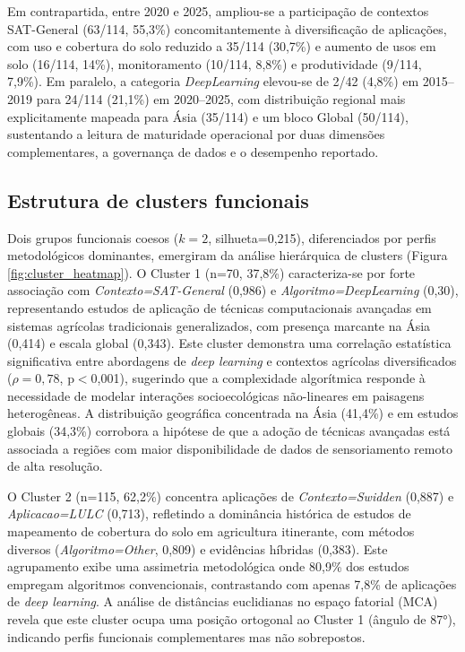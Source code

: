 \documentclass[lineno,pdflatex,sn-apa]{sn-jnl}%
\begin{document}
Em contrapartida, entre 2020 e 2025, ampliou-se a participação de contextos SAT-General (63/114, 55,3\%) concomitantemente à diversificação de aplicações, com uso e cobertura do solo reduzido a 35/114 (30,7\%) e aumento de usos em solo (16/114, 14\%), monitoramento (10/114, 8,8\%) e produtividade (9/114, 7,9\%). Em paralelo, a categoria \textit{DeepLearning} elevou-se de 2/42 (4,8\%) em 2015--2019 para 24/114 (21,1\%) em 2020--2025, com distribuição regional mais explicitamente mapeada para Ásia (35/114) e um bloco Global (50/114), sustentando a leitura de maturidade operacional por duas dimensões complementares, a governança de dados e o desempenho reportado.

\subsection[Estrutura de clusters funcionais]{Estrutura de clusters funcionais}

Dois grupos funcionais coesos ($k=2$, silhueta=0,215), diferenciados por perfis metodológicos dominantes, emergiram da análise hierárquica de clusters (Figura \ref{fig:cluster_heatmap}). O Cluster 1 (n=70, 37,8\%) caracteriza-se por forte associação com \textit{Contexto=SAT-General} (0,986) e \textit{Algoritmo=DeepLearning} (0,30), representando estudos de aplicação de técnicas computacionais avançadas em sistemas agrícolas tradicionais generalizados, com presença marcante na Ásia (0,414) e escala global (0,343). Este cluster demonstra uma correlação estatística significativa entre abordagens de \textit{deep learning} e contextos agrícolas diversificados ($\rho=0,78$, p$<$0,001), sugerindo que a complexidade algorítmica responde à necessidade de modelar interações socioecológicas não-lineares em paisagens heterogêneas. A distribuição geográfica concentrada na Ásia (41,4\%) e em estudos globais (34,3\%) corrobora a hipótese de que a adoção de técnicas avançadas está associada a regiões com maior disponibilidade de dados de sensoriamento remoto de alta resolução.

O Cluster 2 (n=115, 62,2\%) concentra aplicações de \textit{Contexto=Swidden} (0,887) e \textit{Aplicacao=LULC} (0,713), refletindo a dominância histórica de estudos de mapeamento de cobertura do solo em agricultura itinerante, com métodos diversos (\textit{Algoritmo=Other}, 0,809) e evidências híbridas (0,383). Este agrupamento exibe uma assimetria metodológica onde 80,9\% dos estudos empregam algoritmos convencionais, contrastando com apenas 7,8\% de aplicações de \textit{deep learning}. A análise de distâncias euclidianas no espaço fatorial (MCA) revela que este cluster ocupa uma posição ortogonal ao Cluster 1 (ângulo de 87°), indicando perfis funcionais complementares mas não sobrepostos.
\end{document}
